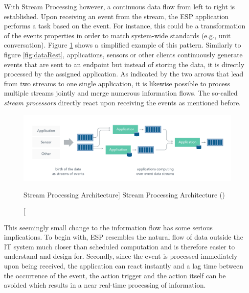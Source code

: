 \begin{enumerate}
    With Stream Processing however, a continuous data flow from left to right is established. Upon receiving an event from the stream, the \acf{ESP} application performs a task based on the event. For instance, this could be a transformation of the events properties in order to match system-wide standards (e.g., unit conversation). 
    Figure \ref{fig:dataStream} shows a simplified example of this pattern. Similarly to figure \ref{fig:dataRest}, applications, sensors or other clients continuously generate events that are sent to an endpoint but instead of storing the data, it is directly processed by the assigned application. As indicated by the two arrows that lead from two streams to one single application, it is likewise possible to process multiple streams jointly and merge numerous information flows. The so-called \textit{stream processors} directly react upon receiving the events as mentioned before. 
    
    \begin{figure}[ht]
        \includegraphics[width=\linewidth]{images/streaming/streming_data.png}\centering
        \caption
        [Stream Processing Architecture]
        {Stream Processing Architecture (\cite{dataArtisans2017WhatProcessing})}
        \label{fig:dataStream}
    \end{figure}
    
    This seemingly small change to the information flow has some serious implications. To begin with, \acf{ESP} resembles the natural flow of data outside the IT system much closer than scheduled computation and is therefore easier to understand and design for. Secondly, since the event is processed immediately upon being received, the application can react instantly and a lag time between the occurrence of the event, the action trigger and the action itself can be avoided which results in a near real-time processing of information. 
    

\end{enumerate}
